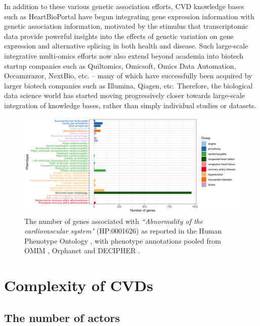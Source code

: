 \documentclass[letter]{bioinfo}
\begin{document}
	In addition to these various genetic association efforts, CVD knowledge bases such as HeartBioPortal \citep{Khomtchouk:2018:HeartBioPortal} have begun integrating gene expression information with genetic association information, motivated by the stimulus that transcriptomic data provide powerful insights into the effects of genetic variation on gene expression and alternative splicing in both health and disease.  Such large-scale integrative multi-omics efforts now also extend beyond academia into biotech startup companies such as Quiltomics, Omicsoft, Omics Data Automation, Occamzrazor, NextBio, etc. -- many of which have successfully been acquired by larger biotech companies such as Illumina, Qiagen, etc.  Therefore, the biological data science world has started moving progressively closer towards large-scale integration of knowledge bases, rather than simply individual studies or datasets.    


		\begin{figure}[!tpb]
		\includegraphics[width=1.\linewidth]{hpo-gene-count}
		\caption{The number of genes associated with \emph{``Abnormality of the cardiovascular system"} (HP:0001626) as reported in the Human Phenotype Ontology \citep{Kohler:2014:Human},
			 with phenotype annotations pooled from OMIM \citep{McKusick:2018:OMIM} , Orphanet \citep{INSERM:1997:Orphanet}  and DECIPHER \citep{Firth:2009:DECIPHER}.}
		\label{fig:hpo_gene_count}	
	\end{figure}
	
	
	
	
	\section*{Complexity of CVDs}  %
	\subsection*{The number of actors}
	
\end{document}
